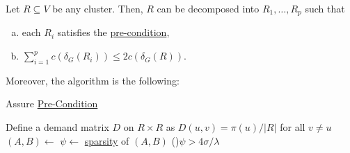 \begin{lemma}
	Let \(R \subseteq V\) be any cluster. Then, \(R\) can be decomposed into \(R_1, \dots , R_p\) such that
	\begin{enumerate}[(a)]
		\item each \(R_i\) satisfies the \hyperref[def:pre-condition]{pre-condition},
		\item \(\sum_{i=1}^{p} c(\delta _G(R_i)) \leq 2 c(\delta _G(R))\).
	\end{enumerate}
	Moreover, the algorithm is the following:

	\begin{algorithm}[H]\label{algo:assure-pre-condition}
		\DontPrintSemicolon{}
		\caption{Assure \hyperref[def:pre-condition]{Pre-Condition}}

		\BlankLine

		Define a demand matrix \(D\) on \(R \times R\) as \(D(u, v) = \pi (u) / \lvert R \rvert \) for all \(v \neq u\)\;
		\((A, B) \gets\)\;
		\(\psi \gets\) \hyperref[def:sparsity]{sparsity} of \((A, B)\)\;
		\;
		\uIf(){\(\psi > 4 \sigma / \lambda \)}{
			\;
		}
	\end{algorithm}
\end{lemma}

